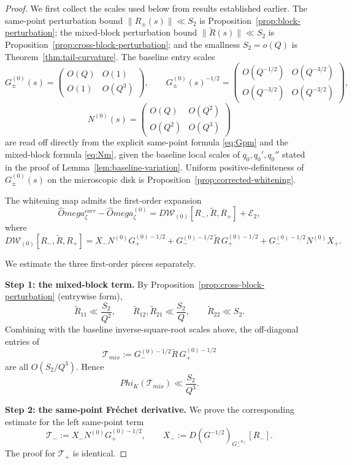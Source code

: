 \documentclass[11pt,a4paper]{amsart}
\def\Omega{Omega}%
\def\Phi{Phi}%
\def\corr{corr}%
\def\mix{mix}%
\theoremstyle{plain}
\theoremstyle{definition}
\newcommand{\corr}{\mathrm{corr}}
\newcommand{\mix}{\mathrm{mix}}
\begin{document}
\begin{proof}
We first collect the scales used below from results established earlier. The
same-point perturbation bound $\|R_\pm(s)\|\ll S_2$ is
Proposition~\ref{prop:block-perturbation}; the mixed-block perturbation bound
$\|\widetilde R(s)\|\ll S_2$ is
Proposition~\ref{prop:cross-block-perturbation}; and the smallness
$S_2=o(Q)$ is Theorem~\ref{thm:tail-curvature}. The baseline entry scales
\[
G_\pm^{(0)}(s)=
\begin{pmatrix} O(Q) & O(1)\\ O(1) & O(Q^3) \end{pmatrix},
\qquad
G_\pm^{(0)}(s)^{-1/2}=
\begin{pmatrix}
O(Q^{-1/2}) & O(Q^{-3/2})\\
O(Q^{-3/2}) & O(Q^{-3/2})
\end{pmatrix},
\]
\[
N^{(0)}(s)=
\begin{pmatrix} O(Q) & O(Q^2)\\ O(Q^2) & O(Q^3) \end{pmatrix}
\]
are read off directly from the explicit same-point formula \eqref{eq:Gpm} and
the mixed-block formula \eqref{eq:Nm}, given the baseline local scales of
$q_0, q_0', q_0''$ stated in the proof of
Lemma~\ref{lem:baseline-variation}. Uniform positive-definiteness of
$G_\pm^{(0)}(s)$ on the microscopic disk is
Proposition~\ref{prop:corrected-whitening}.

The whitening map admits the first-order expansion
\[
\widehat\Omega_\zeta^{\corr}-\widehat\Omega_\zeta^{(0)}
=
D\mathcal W_{(0)}[R_-,\widetilde R,R_+]+\mathcal E_2,
\]
where
\[
D\mathcal W_{(0)}[R_-,\widetilde R,R_+]
=
X_-N^{(0)}G_+^{(0)-1/2}
+
G_-^{(0)-1/2}\widetilde R\,G_+^{(0)-1/2}
+
G_-^{(0)-1/2}N^{(0)}X_+.
\]

We estimate the three first-order pieces separately.

\medskip
\noindent
\textbf{Step 1: the mixed-block term.}
By Proposition~\ref{prop:cross-block-perturbation} (entrywise form),
\[
\widetilde R_{11}\ll \frac{S_2}{Q^2},
\qquad
\widetilde R_{12},\widetilde R_{21}\ll \frac{S_2}{Q},
\qquad
\widetilde R_{22}\ll S_2.
\]
Combining with the baseline inverse-square-root scales above, the off-diagonal
entries of
\[
\mathcal T_{\mix}:=G_-^{(0)-1/2}\widetilde R\,G_+^{(0)-1/2}
\]
are all $O(S_2/Q^3)$. Hence
\[
\Phi_K(\mathcal T_{\mix})\ll \frac{S_2}{Q^3}.
\]

\medskip
\noindent
\textbf{Step 2: the same-point Fréchet derivative.}
We prove the corresponding estimate for the left same-point term
\[
\mathcal T_-:=X_-N^{(0)}G_+^{(0)-1/2},
\qquad
X_-:=D(G^{-1/2})_{G_-^{(0)}}[R_-].
\]
The proof for $\mathcal T_+$ is identical.


\end{proof}
\end{document}
